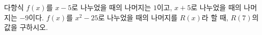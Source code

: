 다항식 $f(x)$를 $x-5$로 나누었을 때의 나머지는 $1$이고, $x+5$로 나누었을 때의 나머지는 $-9$이다. $f(x)$를 $x^2-25$로 나누었을 때의 나머지를 $R(x)$라 할 때, $R(7)$의 값을 구하시오.
